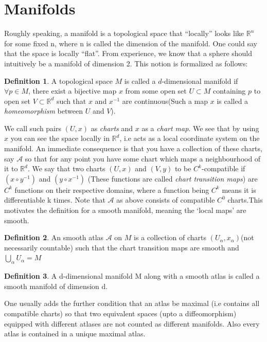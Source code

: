 \documentclass[a4paper]{report}
\theoremstyle{definition}
\newtheorem{definition}{Definition}[section]
\theoremstyle{remark}
\begin{document}
	\section{Manifolds}
		Roughly speaking, a manifold is a topological space that \enquote{locally} looks like $\mathbb{R}^n$ for some fixed n, where n is called the dimension of the manifold. One could say that the space is locally \enquote{flat}. From experience, we know that a sphere should intuitively be a manifold of dimension 2. This notion is formalized as follows:
		\begin{definition} 
			A topological space $M$ is called a $d$-dimensional manifold if $\forall  p \in M$, there exist a bijective map $x$ from some open set $U\subset M$ containing $p$ to open set $V \subset \mathbb{R}^d $ such that $ x$ and $x^{-1}$ are continuous(Such a map $x$ is called a \emph{homeomorphism} between $U$ and $V$).
		\end{definition}
		We call such pairs $(U,x)$ as \emph{charts} and $x$ as a \emph{chart map}. We see that by using $x$ you can see the space locally in $\mathbb{R}^d$, i.e acts as a local coordinate system on the manifold. An immediate consequence is that you have a collection of these charts, say $\mathcal{A}$ so that for any point you have some chart which maps a neighbourhood of it to $\mathbb{R}^d$. 
		We say that two charts $(U,x)$ and $(V,y)$ to be $C^k$-compatible if $(x\circ y^{-1})$ and $(y\circ x^{-1})$ (These functions are called \emph{chart transition maps}) are $C^k$ functions on their respective domains, where a function being $C^k$ means it is differentiable k times.
		Note that $\mathcal{A}$ as above consists of compatible $C^0$ charts.This motivates the definition for a smooth manifold, meaning the ‘local maps’ are smooth.
		\begin{definition}
			An smooth atlas $\mathcal{A}$ on $M$ is a collection of charts $(U_{\alpha},x_{\alpha})$(not necessarily countable) such that the chart transition maps are smooth and $\bigcup\limits_{\alpha}U_{\alpha} = M$\end{definition}
		\begin{definition}
			A d-dimensional manifold M along with a smooth atlas is called a smooth manifold of dimension d.
		\end{definition}
		One usually adds the further condition that an atlas be maximal (i.e contains all compatible charts) so that two equivalent spaces (upto a diffeomorphism) equipped with different atlases are not counted as different manifolds. Also every atlas is contained in a unique maximal atlas.
\end{document}
